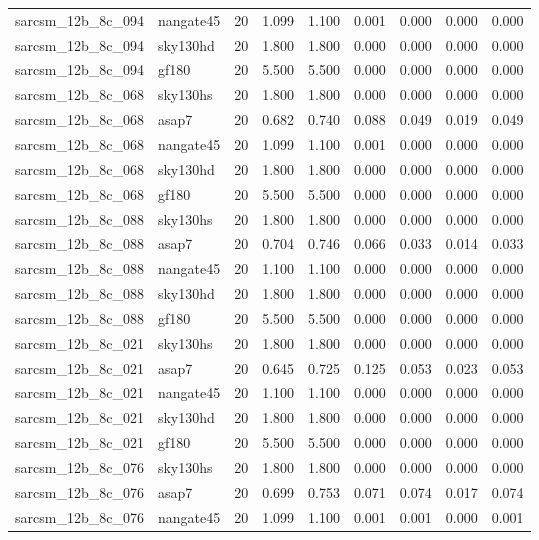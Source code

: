 \begin{tabular}{llrrrrrrr}
sarcsm\_12b\_8c\_094 & nangate45 & 20 & 1.099 & 1.100 & 0.001 & 0.000 & 0.000 & 0.000 \\
sarcsm\_12b\_8c\_094 & sky130hd & 20 & 1.800 & 1.800 & 0.000 & 0.000 & 0.000 & 0.000 \\
sarcsm\_12b\_8c\_094 & gf180 & 20 & 5.500 & 5.500 & 0.000 & 0.000 & 0.000 & 0.000 \\
sarcsm\_12b\_8c\_068 & sky130hs & 20 & 1.800 & 1.800 & 0.000 & 0.000 & 0.000 & 0.000 \\
sarcsm\_12b\_8c\_068 & asap7 & 20 & 0.682 & 0.740 & 0.088 & 0.049 & 0.019 & 0.049 \\
sarcsm\_12b\_8c\_068 & nangate45 & 20 & 1.099 & 1.100 & 0.001 & 0.000 & 0.000 & 0.000 \\
sarcsm\_12b\_8c\_068 & sky130hd & 20 & 1.800 & 1.800 & 0.000 & 0.000 & 0.000 & 0.000 \\
sarcsm\_12b\_8c\_068 & gf180 & 20 & 5.500 & 5.500 & 0.000 & 0.000 & 0.000 & 0.000 \\
sarcsm\_12b\_8c\_088 & sky130hs & 20 & 1.800 & 1.800 & 0.000 & 0.000 & 0.000 & 0.000 \\
sarcsm\_12b\_8c\_088 & asap7 & 20 & 0.704 & 0.746 & 0.066 & 0.033 & 0.014 & 0.033 \\
sarcsm\_12b\_8c\_088 & nangate45 & 20 & 1.100 & 1.100 & 0.000 & 0.000 & 0.000 & 0.000 \\
sarcsm\_12b\_8c\_088 & sky130hd & 20 & 1.800 & 1.800 & 0.000 & 0.000 & 0.000 & 0.000 \\
sarcsm\_12b\_8c\_088 & gf180 & 20 & 5.500 & 5.500 & 0.000 & 0.000 & 0.000 & 0.000 \\
sarcsm\_12b\_8c\_021 & sky130hs & 20 & 1.800 & 1.800 & 0.000 & 0.000 & 0.000 & 0.000 \\
sarcsm\_12b\_8c\_021 & asap7 & 20 & 0.645 & 0.725 & 0.125 & 0.053 & 0.023 & 0.053 \\
sarcsm\_12b\_8c\_021 & nangate45 & 20 & 1.100 & 1.100 & 0.000 & 0.000 & 0.000 & 0.000 \\
sarcsm\_12b\_8c\_021 & sky130hd & 20 & 1.800 & 1.800 & 0.000 & 0.000 & 0.000 & 0.000 \\
sarcsm\_12b\_8c\_021 & gf180 & 20 & 5.500 & 5.500 & 0.000 & 0.000 & 0.000 & 0.000 \\
sarcsm\_12b\_8c\_076 & sky130hs & 20 & 1.800 & 1.800 & 0.000 & 0.000 & 0.000 & 0.000 \\
sarcsm\_12b\_8c\_076 & asap7 & 20 & 0.699 & 0.753 & 0.071 & 0.074 & 0.017 & 0.074 \\
sarcsm\_12b\_8c\_076 & nangate45 & 20 & 1.099 & 1.100 & 0.001 & 0.001 & 0.000 & 0.001 \\

\end{tabular}
